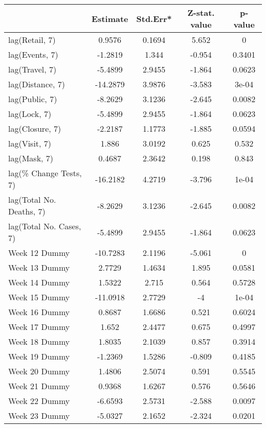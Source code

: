 \begingroup\tiny
\begin{longtable}{lcccc}
  \toprule
 & Estimate & Std.Err* & Z-stat. value & p-value \\ 
  \midrule
lag(Retail, 7) & 0.9576 & 0.1694 & 5.652 & 0 \\ 
  lag(Events, 7) & -1.2819 & 1.344 & -0.954 & 0.3401 \\ 
  lag(Travel, 7) & -5.4899 & 2.9455 & -1.864 & 0.0623 \\ 
  lag(Distance, 7) & -14.2879 & 3.9876 & -3.583 & 3e-04 \\ 
  lag(Public, 7) & -8.2629 & 3.1236 & -2.645 & 0.0082 \\ 
  lag(Lock, 7) & -5.4899 & 2.9455 & -1.864 & 0.0623 \\ 
  lag(Closure, 7) & -2.2187 & 1.1773 & -1.885 & 0.0594 \\ 
  lag(Visit, 7) & 1.886 & 3.0192 & 0.625 & 0.532 \\ 
  lag(Mask, 7) & 0.4687 & 2.3642 & 0.198 & 0.843 \\ 
  lag(\% Change Tests, 7) & -16.2182 & 4.2719 & -3.796 & 1e-04 \\ 
  lag(Total No. Deaths, 7) & -8.2629 & 3.1236 & -2.645 & 0.0082 \\ 
  lag(Total No. Cases, 7) & -5.4899 & 2.9455 & -1.864 & 0.0623 \\ 
  Week 12 Dummy & -10.7283 & 2.1196 & -5.061 & 0 \\ 
  Week 13 Dummy & 2.7729 & 1.4634 & 1.895 & 0.0581 \\ 
  Week 14 Dummy & 1.5322 & 2.715 & 0.564 & 0.5728 \\ 
  Week 15 Dummy & -11.0918 & 2.7729 & -4 & 1e-04 \\ 
  Week 16 Dummy & 0.8687 & 1.6686 & 0.521 & 0.6024 \\ 
  Week 17 Dummy & 1.652 & 2.4477 & 0.675 & 0.4997 \\ 
  Week 18 Dummy & 1.8035 & 2.1039 & 0.857 & 0.3914 \\ 
  Week 19 Dummy & -1.2369 & 1.5286 & -0.809 & 0.4185 \\ 
  Week 20 Dummy & 1.4806 & 2.5074 & 0.591 & 0.5545 \\ 
  Week 21 Dummy & 0.9368 & 1.6267 & 0.576 & 0.5646 \\ 
  Week 22 Dummy & -6.6593 & 2.5731 & -2.588 & 0.0097 \\ 
  Week 23 Dummy & -5.0327 & 2.1652 & -2.324 & 0.0201 \\ 

\end{longtable}

